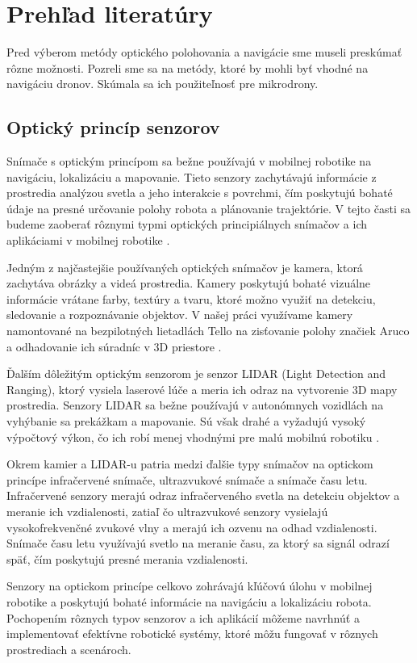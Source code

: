 \section{Prehľad literatúry}
Pred výberom metódy optického polohovania a navigácie sme museli preskúmať rôzne možnosti. Pozreli sme sa na metódy, ktoré by mohli byť vhodné na navigáciu dronov. Skúmala sa ich použiteľnosť pre mikrodrony.

\subsection{Optický princíp senzorov}
Snímače s optickým princípom sa bežne používajú v mobilnej robotike na navigáciu, lokalizáciu a mapovanie. Tieto senzory zachytávajú informácie z prostredia analýzou svetla a jeho interakcie s povrchmi, čím poskytujú bohaté údaje na presné určovanie polohy robota a plánovanie trajektórie. V tejto časti sa budeme zaoberať rôznymi typmi optických principiálnych snímačov a ich aplikáciami v mobilnej robotike \citep{Li2022}.

Jedným z najčastejšie používaných optických snímačov je kamera, ktorá zachytáva obrázky a videá prostredia. Kamery poskytujú bohaté vizuálne informácie vrátane farby, textúry a tvaru, ktoré možno využiť na detekciu, sledovanie a rozpoznávanie objektov. V našej práci využívame kamery namontované na bezpilotných lietadlách Tello na zisťovanie polohy značiek Aruco a odhadovanie ich súradníc v 3D priestore \citep{Li2022}. 

Ďalším dôležitým optickým senzorom je senzor LIDAR (Light Detection and Ranging), ktorý vysiela laserové lúče a meria ich odraz na vytvorenie 3D mapy prostredia. Senzory LIDAR sa bežne používajú v autonómnych vozidlách na vyhýbanie sa prekážkam a mapovanie. Sú však drahé a vyžadujú vysoký výpočtový výkon, čo ich robí menej vhodnými pre malú mobilnú robotiku \citep{Takahashi2014}.
 
Okrem kamier a LIDAR-u patria medzi ďalšie typy snímačov na optickom princípe infračervené snímače, ultrazvukové snímače a snímače času letu. Infračervené senzory merajú odraz infračerveného svetla na detekciu objektov a meranie ich vzdialenosti, zatiaľ čo ultrazvukové senzory vysielajú vysokofrekvenčné zvukové vlny a merajú ich ozvenu na odhad vzdialenosti. Snímače času letu využívajú svetlo na meranie času, za ktorý sa signál odrazí späť, čím poskytujú presné merania vzdialenosti.

Senzory na optickom princípe celkovo zohrávajú kľúčovú úlohu v mobilnej robotike a poskytujú bohaté informácie na navigáciu a lokalizáciu robota. Pochopením rôznych typov senzorov a ich aplikácií môžeme navrhnúť a implementovať efektívne robotické systémy, ktoré môžu fungovať v rôznych prostrediach a scenároch.

